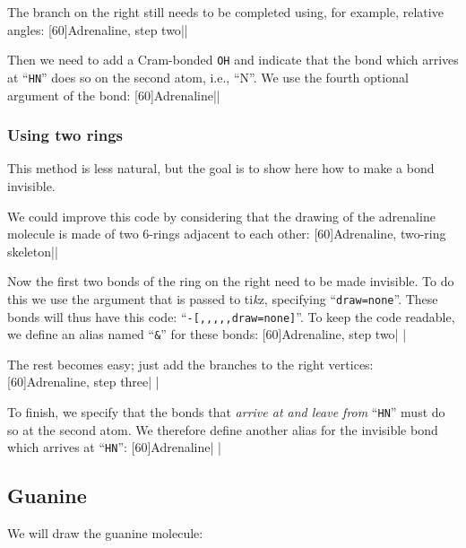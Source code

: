 \documentclass[10pt]{article}
\makeatletter
\newcommand\make@car@active[1]{%
	\catcode`#1\active
	\begingroup
		\lccode`\~`#1\relax
		\lowercase{\endgroup\def~}%
}
\newif\if@exstar
\newcommand\exemple{%
	\begingroup
	\parskip\z@
	\@makeother\;\@makeother\!\@makeother\?\@makeother\:%
	\@ifstar{\@exstartrue\exemple@}{\@exstarfalse\exemple@}}
\newcommand\exemple@[2][65]{%
	\medbreak\noindent
	\begingroup
		\let\do\@makeother\dospecials
		\make@car@active\ { {}}%
		\make@car@active\^^M{\par\leavevmode}%
		\make@car@active\^^I{\space\space}%
		\make@car@active\,{\leavevmode\kern\z@\string,}%
		\make@car@active\-{\leavevmode\kern\z@\string-}%
		\make@car@active\>{\leavevmode\kern\z@\string>}%
		\make@car@active\<{\leavevmode\kern\z@\string<}%
		\exemple@@{#1}{#2}%
}
\newcommand\exemple@@[3]{%
	\def\@tempa##1#3{\exemple@@@{#1}{#2}{##1}}%
	\@tempa
}
\newcommand\exemple@@@[3]{%
	\xdef\the@code{#3}%
	\endgroup
	\if@exstar
		\begingroup
			\fboxrule0.4pt
			\let\breakboxparindent\z@
			\def\bkvz@bottom{\hrule\@height\fboxrule}%
			\let\bkvz@before@breakbox\relax
			\def\bkvz@set@linewidth{\advance\linewidth\dimexpr-2\fboxrule-2\fboxsep}%
			\def\bkvz@left{\vrule\@width\fboxrule\hskip\fboxsep}%
			\def\bkvz@right{\hskip\fboxsep\vrule\@width\fboxrule}%
			\def\bkvz@top{\hbox to \hsize{%
				\vrule\@width\fboxrule\@height\fboxrule
				\leaders\bkvz@bottom\hfill
				\sffamily
				\fboxsep\z@
				\colorbox{black}{\kern0.25em\color{white}\footnotesize\lower0.5ex\hbox{\strut#2}\kern0.25em}%
				\leaders\bkvz@bottom\hfill
				\vrule\@width\fboxrule\@height\fboxrule}}%
			\breakbox
				\kern.5ex\relax
				\ttfamily\footnotesize\the@code\par
				\normalfont
				\kern3pt
				\hrule height0.1pt width\linewidth depth0.1pt
				\vskip5pt
				\rightskip0pt plus 1fill
				\everypar{{\color{lightgray}\rlap{\vrule height0.1pt width\linewidth depth0.1pt}}\hskip0pt plus 1fill}%
				\newlinechar`\^^M\everyeof{\noexpand}\scantokens{#3}\par
			\endbreakbox
		\endgroup
	\else
		\vskip0.5ex
		\boxput*(0,1)
			{\fboxsep\z@
			\hbox{\sffamily\colorbox{black}{\leavevmode\kern0.25em{\color{white}\footnotesize\strut#2}\kern0.25em}}%
			}%
			{\fboxsep5pt
			\fbox{%
				$\vcenter{\hsize\dimexpr0.#1\linewidth-\fboxsep-\fboxrule\relax
					\kern5pt\parskip0pt \ttfamily\footnotesize\the@code}%
				\vcenter{\kern5pt\hsize\dimexpr\linewidth-0.#1\linewidth-\fboxsep-\fboxrule\relax
					\everypar{{\color{lightgray}\rlap{\vrule height0.1pt width\dimexpr\linewidth-0.#1\linewidth-\fboxsep-\fboxrule depth0.1pt}}}%
					\footnotesize\newlinechar`\^^M\everyeof{\noexpand}\scantokens{#3}}$%
				}%
			}%
	\fi
	\medbreak
	\endgroup
}
\newcommand\TIKZ{ti\textit kz\xspace}
\makeatother
\begin{document}
The branch on the right still needs to be completed using, for example, relative angles:
\exemple[60]{Adrenaline, step two}||

Then we need to add a Cram-bonded \verb-OH- and indicate that the bond which arrives at ``\verb-HN-'' does so on the second atom, i.e., ``N''. We use the fourth optional argument of the bond:
\exemple[60]{Adrenaline}||

\subsubsection{Using two rings}
This method is less natural, but the goal is to show here how to make a bond invisible.

We could improve this code by considering that the drawing of the adrenaline molecule is made of two 6-rings adjacent to each other:
\exemple[60]{Adrenaline, two-ring skeleton}||

Now the first two bonds of the ring on the right need to be made invisible. To do this we use the argument that is passed to \TIKZ, specifying ``\verb-draw=none-''. These bonds will thus have this code: ``\verb/-[,,,,,draw=none]/''. To keep the code readable, we define an alias named ``\verb-&-'' for these bonds:
\exemple[60]{Adrenaline, step two}|
|

The rest becomes easy; just add the branches to the right vertices:
\exemple[60]{Adrenaline, step three}|
|

To finish, we specify that the bonds that \emph{arrive at and leave from} ``\verb-HN-'' must do so at the second atom. We therefore define another alias for the invisible bond which arrives at ``\verb-HN-'':
\exemple[60]{Adrenaline}|
|

\subsection{Guanine}
We will draw the guanine molecule:
\medskip
\end{document}
